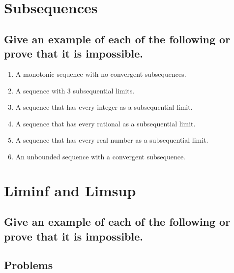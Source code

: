 \documentclass{article}
\theoremstyle{definition}
\begin{document}
\newpage

\section{Subsequences}

\subsection{Give an example of each of the following or prove that it is impossible.}

\begin{enumerate}
    \item A monotonic sequence with no convergent subsequences.
    \item A sequence with 3 subsequential limits.
    \item A sequence that has every integer as a subsequential limit.
    \item A sequence that has every rational as a subsequential limit.
    \item A sequence that has every real number as a subsequential limit.
    \item An unbounded sequence with a convergent subsequence.
\end{enumerate}



\newpage

\section{Liminf and Limsup}

\subsection{Give an example of each of the following or prove that it is impossible.}

\subsection{Problems}
\end{document}

